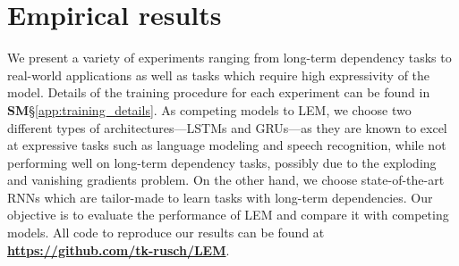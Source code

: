 \documentclass{article} \usepackage{iclr2022_conference,times}
\begin{document}
\section{Empirical results}
\label{sxn:empirical}

We present a variety of experiments ranging from long-term dependency tasks to real-world applications as well as tasks which require high expressivity of the model.  
Details of the training procedure for each experiment can be found in {\bf SM}\S\ref{app:training_details}. 
As competing models to LEM, we choose two different types of architectures---LSTMs and GRUs---as they are known to excel at expressive tasks such as language modeling and speech recognition, while not performing well on long-term dependency tasks, possibly due to the exploding and vanishing gradients problem.  
On the other hand, we choose state-of-the-art RNNs which are tailor-made to learn tasks with long-term dependencies. Our objective is to evaluate the performance of LEM and compare it with competing models.
All code to reproduce our results can be found at \href{https://github.com/tk-rusch/LEM}{\textbf{https://github.com/tk-rusch/LEM}}.
\end{document}
